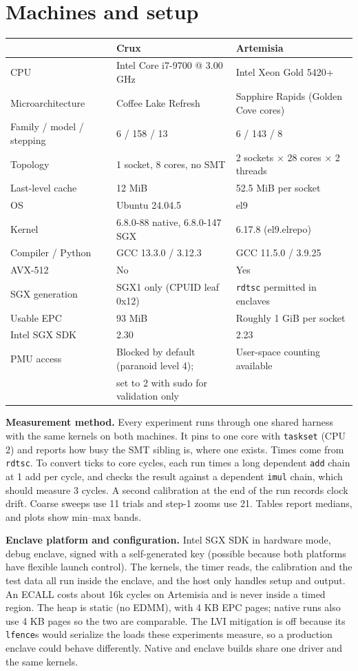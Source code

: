 \documentclass[10pt]{article}
\newcommand{\code}[1]{\texttt{#1}}
\begin{document}
\section{Machines and setup}
\begin{center}
\small
\begin{tabular}{lll}
\toprule
 & Crux & Artemisia\\
\midrule
CPU & Intel Core i7-9700 @ 3.00 GHz & Intel Xeon Gold 5420+\\
Microarchitecture & Coffee Lake Refresh & Sapphire Rapids (Golden Cove cores)\\
Family / model / stepping & 6 / 158 / 13 & 6 / 143 / 8\\
Topology & 1 socket, 8 cores, no SMT & 2 sockets $\times$ 28 cores $\times$ 2 threads\\
Last-level cache & 12 MiB & 52.5 MiB per socket\\
OS & Ubuntu 24.04.5 & el9\\
Kernel & 6.8.0-88 native, 6.8.0-147 SGX & 6.17.8 (el9.elrepo)\\
Compiler / Python & GCC 13.3.0 / 3.12.3 & GCC 11.5.0 / 3.9.25\\
AVX-512 & No & Yes\\
SGX generation & SGX1 only (CPUID leaf 0x12) & \code{rdtsc} permitted in enclaves\\
Usable EPC & 93 MiB & Roughly 1 GiB per socket\\
Intel SGX SDK & 2.30 & 2.23\\
PMU access & Blocked by default (paranoid level 4); & User-space counting available\\
 & set to 2 with sudo for validation only & \\
\bottomrule
\end{tabular}
\end{center}

\textbf{Measurement method.} Every experiment runs through one shared harness with the same kernels on both machines. It pins to one core with \code{taskset} (CPU 2) and reports how busy the SMT sibling is, where one
exists. Times come from \code{rdtsc}. To convert ticks to core cycles, each run times a long dependent
\code{add} chain at 1 add per cycle, and checks the result against a dependent \code{imul} chain, which should
measure 3 cycles. A second calibration at the end of the run records clock drift. Coarse sweeps use 11 trials
and step-1 zooms use 21. Tables report medians, and plots show min--max bands.

\textbf{Enclave platform and configuration.} Intel SGX SDK in hardware mode, debug enclave, signed with a
self-generated key (possible because both platforms have flexible launch control). The kernels, the timer
reads, the calibration and the test data all run inside the enclave, and the host only handles setup and output. An ECALL
costs about 16k cycles on Artemisia and is never inside a timed region. The heap is static (no EDMM), with 4 KB EPC pages;
native runs also use 4 KB pages so the two are comparable. The LVI mitigation is off because its \code{lfence}s would
serialize the loads these experiments measure, so a production enclave could behave differently.
Native and enclave builds share one driver and the same kernels.
\end{document}
